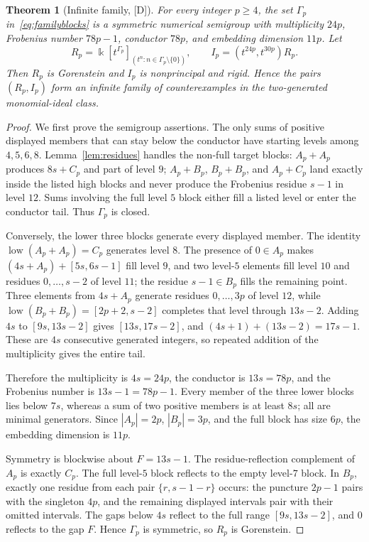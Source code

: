 \documentclass[11pt]{article}
\newtheorem{theorem}{Theorem}[section]
\theoremstyle{definition}
\theoremstyle{remark}
\newcommand{\kfield}{\Bbbk}
\begin{document}
\begin{theorem}[Infinite family, {[D]}]\label{thm:family}
For every integer $p\ge4$, the set $\Gamma_p$ in~\eqref{eq:familyblocks} is a symmetric numerical
semigroup with multiplicity $24p$, Frobenius number $78p-1$, conductor $78p$, and embedding
dimension $11p$. Let
\[
R_p=\kfield[t^{\Gamma_p}]_{(t^n:n\in\Gamma_p\setminus\{0\})},\qquad
I_p=(t^{24p},t^{30p})R_p.
\]
Then $R_p$ is Gorenstein and $I_p$ is nonprincipal and rigid. Hence the pairs $(R_p,I_p)$ form an
infinite family of counterexamples in the two-generated monomial-ideal class.
\end{theorem}
\begin{proof}
We first prove the semigroup assertions. The only sums of positive displayed members that can stay
below the conductor have starting levels among $4,5,6,8$. Lemma~\ref{lem:residues} handles the
non-full target blocks: $A_p+A_p$ produces $8s+C_p$ and part of level $9$;
$A_p+B_p$, $B_p+B_p$, and $A_p+C_p$ land exactly inside the listed high blocks and never produce
the Frobenius residue $s-1$ in level $12$. Sums involving the full level $5$ block either fill a
listed level or enter the conductor tail. Thus $\Gamma_p$ is closed.

Conversely, the lower three blocks generate every displayed member. The identity
$\operatorname{low}(A_p+A_p)=C_p$ generates level $8$. The presence of $0\in A_p$ makes
$(4s+A_p)+[5s,6s-1]$ fill level $9$, and two level-$5$ elements fill level $10$ and residues
$0,\ldots,s-2$ of level $11$; the residue $s-1\in B_p$ fills the remaining point. Three elements
from $4s+A_p$ generate residues $0,\ldots,3p$ of level $12$, while
$\operatorname{low}(B_p+B_p)=[2p+2,s-2]$ completes that level through $13s-2$.
Adding $4s$ to $[9s,13s-2]$ gives $[13s,17s-2]$, and
$(4s+1)+(13s-2)=17s-1$. These are $4s$ consecutive generated integers, so repeated addition of
the multiplicity gives the entire tail.

Therefore the multiplicity is $4s=24p$, the conductor is $13s=78p$, and the Frobenius number is
$13s-1=78p-1$. Every member of the three lower blocks lies below $7s$, whereas a sum of two
positive members is at least $8s$; all are minimal generators. Since
$|A_p|=2p$, $|B_p|=3p$, and the full block has size $6p$, the embedding dimension is $11p$.

Symmetry is blockwise about $F=13s-1$. The residue-reflection complement of $A_p$ is exactly
$C_p$. The full level-$5$ block reflects to the empty level-$7$ block. In $B_p$, exactly one
residue from each pair $\{r,s-1-r\}$ occurs: the puncture $2p-1$ pairs with the singleton $4p$,
and the remaining displayed intervals pair with their omitted intervals. The gaps below $4s$
reflect to the full range $[9s,13s-2]$, and $0$ reflects to the gap $F$. Hence $\Gamma_p$ is
symmetric, so $R_p$ is Gorenstein.


\end{proof}
\end{document}
